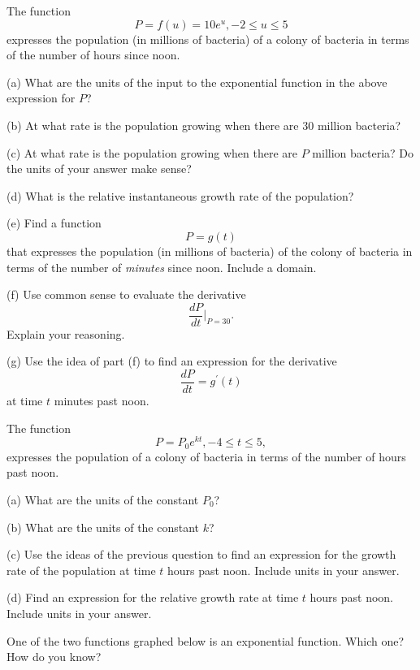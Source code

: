 \documentclass{ximera}
\begin{document}
\begin{question} \label{Q:432g4gh}
The function 
\[
       P = f(u) = 10e^u , -2\leq u \leq 5
\]
expresses the population (in millions of bacteria) of a colony of bacteria in terms of the number of hours since noon.

(a) What are the units of the input to the exponential function in the above expression for $P$?

(b) At what rate is the population growing when there are 30 million bacteria?

(c) At what rate is the population growing when there are $P$ million bacteria? Do the units of your answer make sense?

(d) What is the relative instantaneous growth rate of the population?

(e) Find a function
\[
         P = g(t) 
\]   
that expresses the population  (in millions of bacteria) of the colony of bacteria in terms of the number of \emph{minutes} since noon. Include a domain.

(f) Use common sense to evaluate the derivative
\[
      \frac{dP}{dt}\Big|_{P=30} .
\]
Explain your reasoning.

(g) Use the idea of part (f) to find an expression for the derivative
\[
    \frac{dP}{dt} = g^\prime(t)
\]
at time $t$ minutes past noon.

\end{question}


\begin{question}  \label{Q:3dgtnzz}
The function 
\[
      P = P_0 e^{kt}, -4\leq t \leq 5 ,
\]
expresses the population of a colony of bacteria in terms of the number of hours past noon.


(a) What are the units of the constant $P_0$?

(b) What are the units of the constant $k$?

(c) Use the ideas of the previous question to find an expression for the growth rate of the population at time $t$ hours past noon. Include units in your answer.

(d) Find an expression for the relative growth rate at time $t$ hours past noon. Include units in your answer.

\end{question}



\begin{question} \label{Qdcvbrtt}
One of the two functions graphed below is an exponential function. Which one? How do you know?
\end{question}
\end{document}
